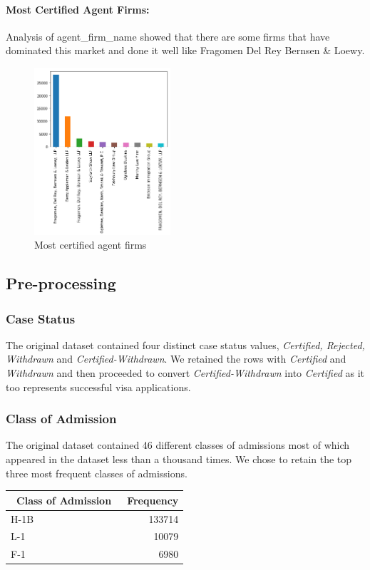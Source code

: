 \documentclass[conference]{IEEEtran}
\begin{document}
\paragraph{\textbf{Most Certified Agent Firms: }}
Analysis of agent\_firm\_name showed that there are some firms that have dominated this market and done it well like Fragomen Del Rey Bernsen & Loewy.
\begin{center}
\begin{figure}[h]
\includegraphics[width=0.45\textwidth]{firm.png}
\caption{Most certified agent firms}
\label{fig:mesh1}
\end{figure}
\end{center}




\subsection{\textbf{Pre-processing}}

\subsubsection{\textbf{Case Status}}
The original dataset contained four distinct case status values, \textit{Certified, Rejected, Withdrawn} and \textit{ Certified-Withdrawn}. We retained the rows with \textit{Certified} and \textit{Withdrawn} and then proceeded to convert \textit{Certified-Withdrawn} into \textit{Certified} as it too represents successful visa applications.
\subsubsection{\textbf{Class of Admission}}
The original dataset contained 46 different classes of admissions most of which appeared in the dataset less than a thousand times. We chose to retain the top three most frequent classes of admissions.
\begin{center}
 \label{tab:title}
  \begin{tabularx}{0.3\textwidth}{| l | r| }
  \hline
     \ Class of Admission & \ Frequency\\ \hline
    H-1B & 133714 \\ 
    L-1 & 10079 \\
    F-1 & 6980  \\\hline
  \end{tabularx}
  \end{center}
\end{document}
